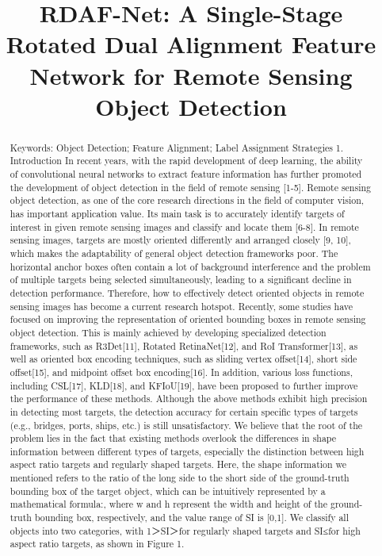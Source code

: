 \documentclass[10pt,twocolumn,final]{article}
\begin{document}
\title{RDAF-Net: A Single-Stage Rotated Dual Alignment Feature Network for Remote Sensing Object Detection}
\author{}
\maketitle

\begin{abstract}
Keywords: Object Detection; Feature Alignment; Label Assignment Strategies
1. Introduction
In recent years, with the rapid development of deep learning, the ability of convolutional neural networks to extract feature information has further promoted the development of object detection in the field of remote sensing [1-5]. Remote sensing object detection, as one of the core research directions in the field of computer vision, has important application value. Its main task is to accurately identify targets of interest in given remote sensing images and classify and locate them [6-8]. In remote sensing images, targets are mostly oriented differently and arranged closely [9, 10], which makes the adaptability of general object detection frameworks poor. The horizontal anchor boxes often contain a lot of background interference and the problem of multiple targets being selected simultaneously, leading to a significant decline in detection performance. Therefore, how to effectively detect oriented objects in remote sensing images has become a current research hotspot. Recently, some studies have focused on improving the representation of oriented bounding boxes in remote sensing object detection. This is mainly achieved by developing specialized detection frameworks, such as R3Det[11], Rotated RetinaNet[12], and RoI Transformer[13], as well as oriented box encoding techniques, such as sliding vertex offset[14], short side offset[15], and midpoint offset box encoding[16]. In addition, various loss functions, including CSL[17], KLD[18], and KFIoU[19], have been proposed to further improve the performance of these methods.
Although the above methods exhibit high precision in detecting most targets, the detection accuracy for certain specific types of targets (e.g., bridges, ports, ships, etc.) is still unsatisfactory. We believe that the root of the problem lies in the fact that existing methods overlook the differences in shape information between different types of targets, especially the distinction between high aspect ratio targets and regularly shaped targets. Here, the shape information we mentioned refers to the ratio of the long side to the short side of the ground-truth bounding box of the target object, which can be intuitively represented by a mathematical formula:, where w and h represent the width and height of the ground-truth bounding box, respectively, and the value range of SI is [0,1]. We classify all objects into two categories, with 1＞SI＞for regularly shaped targets and SI≤for high aspect ratio targets, as shown in Figure 1.
\end{abstract}
\end{document}
